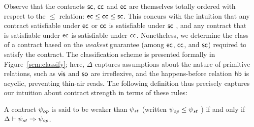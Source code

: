 \noindent Observe that the contracts ${\sf sc}$, ${\sf cc}$ and ${\sf ec}$ are
themselves totally ordered with respect to the $\le$ relation: ${\sf ec} \le
{\sf cc} \le {\sf sc}$. This concurs with the intuition that any contract
satisfiable under ${\sf ec}$ or ${\sf cc}$ is satisfiable under ${\sf sc}$ , and any
contract that is satisfiable under ${\sf ec}$ is satisfiable under
${\sf cc}$. Nonetheless, we determine the class of a contract based on the
\emph{weakest} guarantee (among ${\sf ec}$, ${\sf cc}$, and ${\sf sc}$) required to
satisfy the contract. The classification scheme is presented formally
in Figure~\ref{sem:classify}; here, $\Delta$ captures assumptions about the nature of primitive
relations, such as ${\normalfont \textsf{vis}}$ and ${\normalfont \textsf{so}}$ are irreflexive, and the happens-before
relation ${\normalfont \textsf{hb}}$ is acyclic, preventing thin-air reads.   The following definition thus precisely
captures our intuition about contract strength in terms of these rules:

\begin{definition}
A contract $\psi_{op}$ is said to be weaker than $\psi_{st}$ (written $\psi_{op}
\le \psi_{st}$ ) if and only if $\Delta \vdash \psi_{st} \Rightarrow \psi_{op}$.
\begin{center}
\end{center}
\end{definition}
\vspace{-1em}



